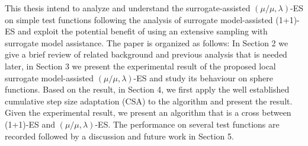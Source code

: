 This thesis intend to analyze and understand the surrogate-assisted $(\mu/\mu,\lambda)$-ES on simple test functions following the analysis of  surrogate model-assisted (1+1)-ES \cite{DBLP:conf/ppsn/KayhaniA18} and exploit the potential benefit of using an extensive sampling with surrogate model assistance. The paper is organized as follows: In Section 2 we give a brief review of related background and previous analysis that is needed later, in Section 3 we present the experimental result of the proposed local surrogate model-assisted $(\mu/\mu,\lambda)$-ES and study its behaviour on sphere functions. Based on the result, in Section 4, we first apply the well established cumulative step size adaptation (CSA) to the algorithm and present the result. Given the experimental result, we present an algorithm that is a cross between (1+1)-ES and $(\mu/\mu,\lambda)$-ES. The performance on several test functions are recorded followed by a discussion and future work in Section 5. 












